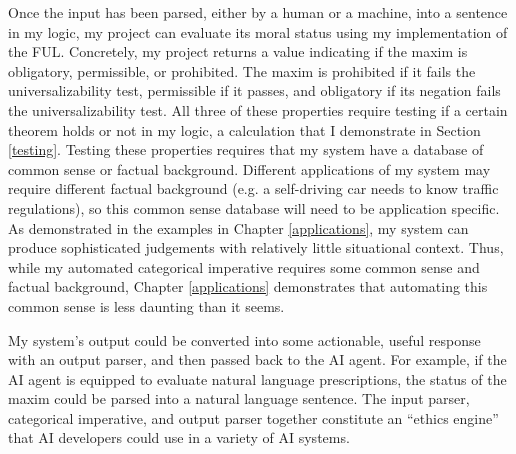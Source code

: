 \begin{isabellebody}
\begin{isamarkuptext}
Once the input has been parsed, either by a human or a machine, into a sentence in my logic, my 
project can evaluate its moral status using my implementation of 
the FUL. Concretely, my project returns a value indicating if the maxim is obligatory, permissible, 
or prohibited. The maxim is prohibited if it fails the universalizability test, permissible if it passes, and obligatory 
if its negation fails the universalizability test. All three of these properties require testing if a 
certain theorem holds or not in my logic, a calculation that I demonstrate in Section \ref{testing}. 
Testing these properties requires that my system have a database of common sense or factual background. 
Different applications of my system may require different factual background (e.g. a self-driving car 
needs to know traffic regulations), so this common sense database will need to be application 
specific. As demonstrated in the examples in Chapter \ref{applications}, my system can produce sophisticated 
judgements with relatively little situational context. Thus, while my automated categorical imperative
requires some common sense and factual background, Chapter \ref{applications} demonstrates that automating
this common sense is less daunting than it seems.

My system's output could be converted into some actionable, useful response with an output parser, 
and then passed back to the AI agent. For example, if the AI agent is equipped to evaluate natural 
language prescriptions, the status of the maxim could be parsed into a natural language sentence. The 
input parser, categorical imperative, and output parser together constitute an ``ethics engine'' 
that AI developers could use in a variety of AI systems.


\end{isamarkuptext}
\end{isabellebody}
